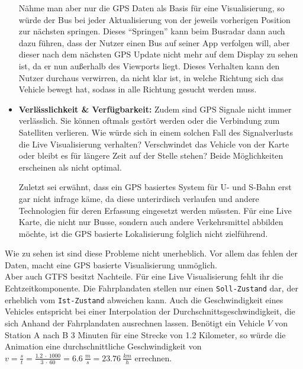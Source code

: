 \begin{itemize}[label={}]
      Nähme man aber nur die GPS Daten als Basis für eine Visualisierung, so würde der Bus bei jeder Aktualisierung von der jeweils vorherigen Position zur nächsten springen. Dieses "`Springen"' kann beim Busradar dann auch dazu führen, dass der Nutzer einen Bus auf seiner App verfolgen will, aber dieser nach dem nächsten GPS Update nicht mehr auf dem Display zu sehen ist, da er nun außerhalb des Viewports liegt. Dieses Verhalten kann den Nutzer durchaus verwirren, da nicht klar ist, in welche Richtung sich das Vehicle bewegt hat, sodass in alle Richtung gesucht werden muss.

    \item \textbf{Verlässlichkeit \& Verfügbarkeit:} 
      Zudem sind GPS Signale nicht immer verlässlich. Sie können oftmals gestört werden oder die Verbindung zum Satelliten verlieren. Wie würde sich in einem solchen Fall des Signalverlusts die Live Visualisierung verhalten? Verschwindet das Vehicle von der Karte oder bleibt es für längere Zeit auf der Stelle stehen? Beide Möglichkeiten erscheinen als nicht optimal. 

      Zuletzt sei erwähnt, dass ein GPS basiertes System für U- und S-Bahn erst gar nicht infrage käme, da diese unterirdisch verlaufen und andere Technologien für deren Erfassung eingesetzt werden müssten. Für eine Live Karte, die nicht nur Busse, sondern auch andere Verkehrsmittel abbilden möchte, ist die GPS basierte Lokalisierung folglich nicht zielführend.
  \end{itemize} 

  Wie zu sehen ist sind diese Probleme nicht unerheblich. Vor allem das fehlen der Daten, macht eine GPS basierte Visualisierung unmöglich.\\

  Aber auch GTFS besitzt Nachteile. Für eine Live Visualisierung fehlt ihr die Echtzeitkomponente. Die Fahrplandaten stellen nur einen \texttt{Soll-Zustand} dar, der erheblich vom \texttt{Ist-Zustand} abweichen kann. Auch die Geschwindigkeit eines Vehicles entspricht bei einer Interpolation der Durchschnittsgeschwindigkeit, die sich Anhand der Fahrplandaten ausrechnen lassen. Benötigt ein Vehicle $V$ von Station A nach B 3 Minuten für eine Strecke von 1.2 Kilometer, so würde die Animation eine durchschnittliche Geschwindigkeit von $v = \frac{s}{t} = \frac{1.2 \: \cdot \: 1000}{3 \: \cdot \: 60} = 6.6 \: \frac{m}{s} = 23.76 \: \frac{km}{h}$ errechnen.


